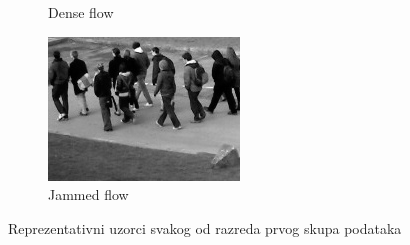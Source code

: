 \documentclass[times, utf8, zavrsni]{fer}
\begin{document}
\begin{figure}[ht]
\begin{subfigure}[b]{0.19\linewidth}
		\caption{Dense flow}
	\end{subfigure}
	\begin{subfigure}[b]{0.19\linewidth}
		\centering
		\includegraphics[scale=0.5]{img/jammedflow.jpg}
		\caption{Jammed flow}
	\end{subfigure}
\caption{Reprezentativni uzorci svakog od razreda prvog skupa podataka}
\end{figure}
\end{document}
